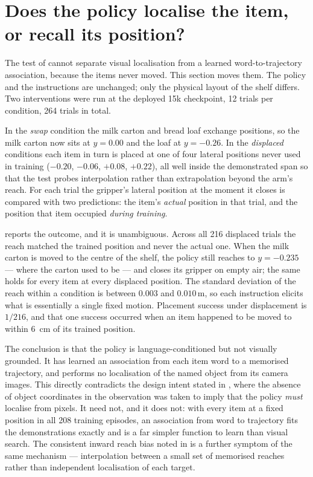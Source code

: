\section{Does the policy localise the item, or recall its position?}
\label{sec:results-lookup}
The test of  cannot separate visual localisation from a
learned word-to-trajectory association, because the items never moved. This section
moves them. The policy and the instructions are unchanged; only the physical layout of
the shelf differs. Two interventions were run at the deployed 15k checkpoint, 12 trials
per condition, 264 trials in total.

In the \emph{swap} condition the milk carton and bread loaf exchange positions, so the
milk carton now sits at $y=0.00$ and the loaf at $y=-0.26$. In the \emph{displaced}
conditions each item in turn is placed at one of four lateral positions never used in
training ($-0.20$, $-0.06$, $+0.08$, $+0.22$), all well inside the demonstrated span so
that the test probes interpolation rather than extrapolation beyond the arm's reach.
For each trial the gripper's lateral position at the moment it closes is compared with
two predictions: the item's \emph{actual} position in that trial, and the position that
item occupied \emph{during training}.

 reports the outcome, and it is unambiguous. Across all 216
displaced trials the reach matched the trained position and never the actual one. When
the milk carton is moved to the centre of the shelf, the policy still reaches to
$y=-0.235$ --- where the carton used to be --- and closes its gripper on empty air; the
same holds for every item at every displaced position. The standard deviation of the
reach within a condition is between $0.003$ and $0.010$\,\si{m}, so each instruction
elicits what is essentially a single fixed motion. Placement success under displacement
is $1/216$, and that one success occurred when an item happened to be moved to within
\SI{6}{cm} of its trained position.

The conclusion is that the policy is language-conditioned but not visually grounded. It
has learned an association from each item word to a memorised trajectory, and performs
no localisation of the named object from its camera images. This directly contradicts
the design intent stated in , where the absence of object
coordinates in the observation was taken to imply that the policy \emph{must} localise
from pixels. It need not, and it does not: with every item at a fixed position in all
208 training episodes, an association from word to trajectory fits the demonstrations
exactly and is a far simpler function to learn than visual search. The consistent
inward reach bias noted in  is a further symptom of the
same mechanism --- interpolation between a small set of memorised reaches rather than
independent localisation of each target.


